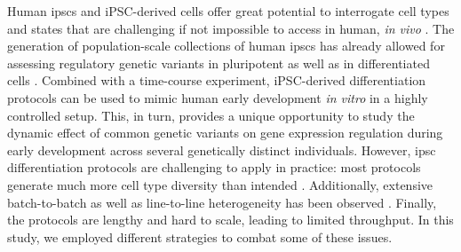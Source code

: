Human \gls{ipsc}s and iPSC-derived cells offer great potential to interrogate cell types and states that are challenging if not impossible to access in human, \textit{in vivo} \cite{kilpinen2017common}.
The generation of population-scale collections of human \gls{ipsc}s \cite{kilpinen2017common, carcamo2017analysis} has already allowed for assessing regulatory genetic variants in pluripotent \cite{kilpinen2017common, carcamo2017analysis} as well as in differentiated cells \cite{schwartzentruber2018molecular, alasoo2018shared, pashos2017large}.
Combined with a time-course experiment, iPSC-derived differentiation protocols can be used to mimic human early development \textit{in vitro} in a highly controlled setup. This, in turn, provides a unique opportunity to study the dynamic effect of common genetic variants on gene expression regulation during early development across several genetically distinct individuals.
However, \gls{ipsc} differentiation protocols are challenging to apply in practice: most protocols generate much more cell type diversity than intended
\cite{bock2011reference}.
Additionally, extensive batch-to-batch as well as line-to-line heterogeneity has been observed \cite{schwartzentruber2018molecular, carcamo2017analysis}. 
Finally, the protocols are lengthy and hard to scale, leading to limited throughput.
In this study, we employed different strategies to combat some of these issues.



